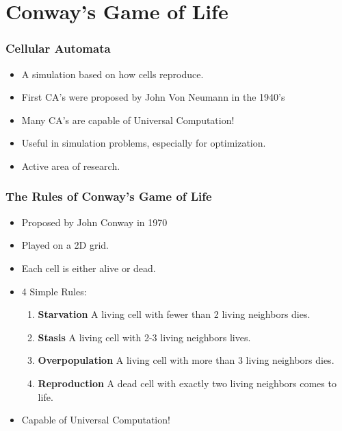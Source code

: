 \documentclass[handout]{beamer}
\begin{document}
\section{Conway's Game of Life}
\begin{frame}
    \frametitle{Cellular Automata}
    \begin{itemize}
        \item A simulation based on how cells reproduce.
        \item First CA's were proposed by John Von Neumann in the 1940's
        \item Many CA's are capable of Universal Computation!
        \item Useful in simulation problems, especially for optimization.
        \item Active area of research.
    \end{itemize}
\end{frame}

\begin{frame}
    \frametitle{The Rules of Conway's Game of Life}
    \begin{itemize}
    \item Proposed by John Conway in 1970
    \item Played on a 2D grid. 
    \item Each cell is either alive or dead.
    \item 4 Simple Rules:
    \begin{enumerate}
        \item {\bf Starvation} A living cell with fewer than 2 living         
            neighbors dies.
        \item {\bf Stasis} A living cell with 2-3 living neighbors lives.
        \item {\bf Overpopulation} A living cell with more than 3 living 
            neighbors dies.
        \item {\bf Reproduction} A dead cell with exactly two living 
           neighbors comes to life.
    \end{enumerate}
    \item Capable of Universal Computation!
    \end{itemize}
\end{frame}
\end{document}
